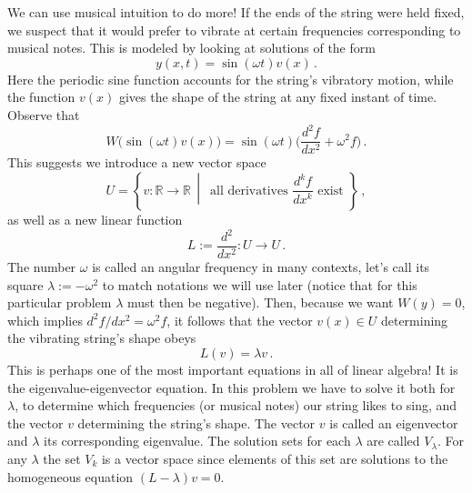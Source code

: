 \begin{example}
We can use musical intuition to do more! If the ends of the string were held fixed, we suspect that it would prefer to vibrate at certain frequencies corresponding to musical notes.
This is modeled by looking at solutions of the form
\[
y(x,t)=\sin(\omega t) v(x)\, .
\]
Here the periodic sine function accounts for the string's vibratory motion, while the function $v(x)$ gives the shape of the string at any fixed instant of time. Observe that
\[
W\big(\sin(\omega t) v(x)\big)=\sin(\omega t)\big(\frac{d^2f}{dx^2}+\omega^2 f\big)\, .
\]
This suggests we introduce a new vector space \[U=\left\{v:{\mathbb R}\to {\mathbb R}\, \middle| \, \text{ all derivatives } \frac{d^kf}{d x^k }\text{~exist~} \right\}\, ,
\]
as well as a new linear function
\[
L:=\frac{d^2}{dx^2}: U\longrightarrow U\, .
\]
The number $\omega$ is called an angular frequency in many contexts, let's call its square $\lambda:=-\omega^2$ to match notations we will use later (notice that for this particular problem $\lambda$ must then  be negative).
Then, because we want $W(y)=0$, which implies $d^2 f/dx^2=\omega^2 f$, it follows that the vector $v(x)\in U$ determining the vibrating string's shape obeys
\[
L(v)=\lambda v\, .
\]
This is perhaps one of the most important equations in all of linear algebra! It is the eigenvalue-eigenvector equation. In this problem we have to solve it both for $\lambda$, to determine which frequencies (or musical notes) our string likes to sing, and the vector $v$ determining the string's shape. The vector $v$ is called an eigenvector and $\lambda$ its corresponding eigenvalue.
The solution sets for each $\lambda$ are called $V_\lambda$. For any $\lambda$ the set $V_k$ is a vector space since elements of this set are solutions to the homogeneous equation $(L-\lambda)v=0.$ 



\end{example}


